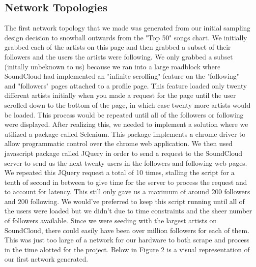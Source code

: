 \documentclass{article}
\begin{document}
\subsection{Network Topologies}
The first network topology that we made was generated from our initial sampling design decision to
snowball outwards from the "Top 50" songs chart.  We initially grabbed each of the artists on this
page and then grabbed a subset of their followers and the users the artists were following.  We only
grabbed a subset (initally unbeknown to us) because we ran into a large roadblock where SoundCloud
had implemented an "infinite scrolling" feature on the "following" and "followers" pages attached to
a profile page.  This feature loaded only twenty different artists initially when you made a request
for the page until the user scrolled down to the bottom of the page, in which case twenty more
artists would be loaded.  This process would be repeated until all of the followers or following
were displayed.  After realizing this, we needed to implement a solution where we utilized a package
called Selenium. This package implements a chrome driver to allow programmatic control over the
chrome web application.  We then used javascript package called JQuery in order to send a request to
the SoundCloud server to send us the next twenty users in the followers and following web pages.  We
repeated this JQuery request a total of 10 times, stalling the script for a tenth of second in
between to give time for the server to process the request and to account for latency.  This still
only gave us a maximum of around 200 followers and 200 following.  We would've preferred to keep
this script running until all of the users were loaded but we didn't due to time constraints and the
sheer number of followers available. Since we were seeding with the largest artists on SoundCloud,
there could easily have been over million followers for each of them. This was just too large of a
network for our hardware to both scrape and process in the time alotted for the project.  Below in Figure 2 is a visual representation of our first network generated. 
\end{document}

